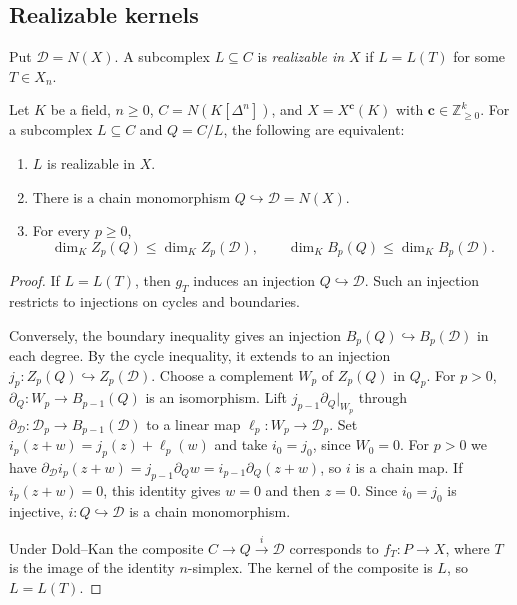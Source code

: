 \subsection{Realizable kernels}

Put $\mathcal D=N(X)$. A subcomplex $L\subseteq C$ is
\emph{realizable in $X$} if $L=L(T)$ for some $T\in X_n$.

\begin{proposition}\label{prop:kernel-realizability}
Let $K$ be a field, $n\geq0$, $C=N(K[\Delta^n])$, and
$X=X^{\mathbf c}(K)$ with $\mathbf c\in\mathbb Z_{\geq0}^k$.
For a subcomplex $L\subseteq C$ and $Q=C/L$, the following are equivalent:
\begin{enumerate}
\item $L$ is realizable in $X$.
\item There is a chain monomorphism $Q\hookrightarrow\mathcal D=N(X)$.
\item For every $p\geq0$,
\begin{equation}\label{eq:realizability-inequalities}
 \dim_K Z_p(Q)\leq\dim_K Z_p(\mathcal D),\qquad
 \dim_K B_p(Q)\leq\dim_K B_p(\mathcal D).
\end{equation}
\end{enumerate}
\end{proposition}
\begin{proof}
If $L=L(T)$, then $g_T$ induces an injection $Q\hookrightarrow\mathcal D$.
Such an injection restricts to injections on cycles and boundaries.

Conversely, the boundary inequality gives an injection
$B_p(Q)\hookrightarrow B_p(\mathcal D)$ in each degree. By the cycle
inequality, it extends to an injection $j_p:Z_p(Q)\hookrightarrow Z_p(\mathcal D)$.
Choose a complement $W_p$ of $Z_p(Q)$ in $Q_p$. For $p>0$,
$\partial_Q:W_p\to B_{p-1}(Q)$ is an isomorphism. Lift
$j_{p-1}\partial_Q|_{W_p}$ through
$\partial_{\mathcal D}:\mathcal D_p\to B_{p-1}(\mathcal D)$ to a
linear map $\ell_p:W_p\to\mathcal D_p$. Set
$i_p(z+w)=j_p(z)+\ell_p(w)$ and take $i_0=j_0$, since $W_0=0$.
For $p>0$ we have $\partial_{\mathcal D}i_p(z+w)=j_{p-1}\partial_Qw
=i_{p-1}\partial_Q(z+w)$, so $i$ is a chain map. If $i_p(z+w)=0$,
this identity gives $w=0$ and then $z=0$. Since $i_0=j_0$ is injective,
$i:Q\hookrightarrow\mathcal D$ is a chain monomorphism.

Under Dold--Kan the composite $C\to Q\xrightarrow{i}\mathcal D$
corresponds to $f_T:P\to X$, where $T$ is the image of the identity
$n$-simplex. The kernel of the composite is $L$, so $L=L(T)$.
\end{proof}

